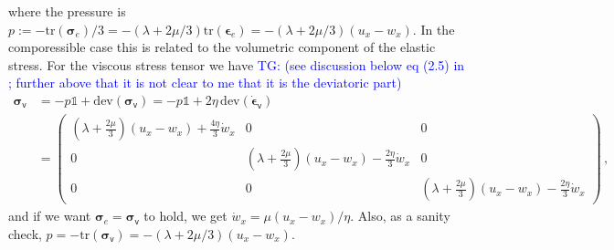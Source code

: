 \documentclass[11pt,a4paper]{article}
\newcommand{\tg}[1]{\textcolor{blue}{TG: #1} }
\newcommand{\bb}[1]{\boldsymbol{#1}}
\newcommand{\dev}{\text{dev}}
\newcommand{\varv}{\mathsf{v}}
\newcommand{\tr}{\text{tr}}
\begin{document}
where the pressure is $ p := -  \tr(\bb{\sigma}_e)/3 = - (\lambda + 2 \mu/3) \tr(\bb{\epsilon}_e) = -(\lambda + 2 \mu/3)(u_x - w_x)$. In the comporessible case this is related to the volumetric component of the elastic stress. For the viscous stress tensor we have 
%
\tg{(see discussion below eq (2.5) in \cite{stocek2023}; further above that it is not clear to me that it is the deviatoric part)}
%
\begin{align*}
    \bb{\sigma}_\varv 
    &
    = - p \mathbb{1} + \dev(\bb{\sigma}_\varv) 
    = - p \mathbb{1} + 2 \eta \, \dev(\bb{\dot{\epsilon}}_\varv)
    \\
    &
    =
    \begin{pmatrix}
    (\lambda + \frac{2 \mu}{3}) (u_x-w_x) + \frac{4 \eta}{3} \dot{w}_x & 0 & 0 \\
    0 & (\lambda + \frac{2 \mu}{3}) (u_x-w_x) - \frac{2 \eta}{3} \dot{w}_x & 0 \\
    0 & 0 & (\lambda + \frac{2 \mu}{3}) (u_x-w_x) - \frac{2 \eta}{3} \dot{w}_x
    \end{pmatrix}
    \,,
\end{align*}
and if we want $\bb{\sigma}_e = \bb{\sigma}_\varv$ to hold, we get $\dot{w}_x = \mu (u_x - w_x)/\eta$. Also, as a sanity check, $p = - \tr(\bb{\sigma}_\varv) = -(\lambda + 2 \mu/3)(u_x - w_x)$.
\end{document}
